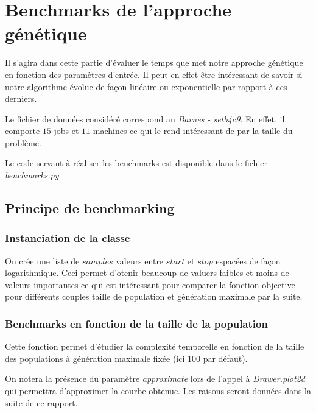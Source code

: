 \section{Benchmarks de l'approche génétique}

Il s'agira dans cette partie d'évaluer le temps que met notre approche génétique en fonction des paramètres d'entrée. Il peut en effet être intéressant de savoir si notre algorithme évolue de façon linéaire ou exponentielle par rapport à ces derniers.

Le fichier de données considéré correspond au \textit{Barnes - setb4c9}. En effet, il comporte $15$ jobs et $11$ machines ce qui le rend intéressant de par la taille du problème.

Le code servant à réaliser les benchmarks est disponible dans le fichier \textit{benchmarks.py}.

\subsection{Principe de benchmarking}

\subsubsection{Instanciation de la classe}



On crée une liste de $samples$ valeurs entre $start$ et $stop$ espacées de façon logarithmique. Ceci permet d'otenir beaucoup de valuers faibles et moins de valeurs importantes ce qui est intéressant pour comparer la fonction objective pour différents couples taille de population et génération maximale par la suite.

\subsubsection{Benchmarks en fonction de la taille de la population}



Cette fonction permet d'étudier la complexité temporelle en fonction de la taille des populations à génération maximale fixée (ici 100 par défaut).

On notera la présence du paramètre \textit{approximate} lors de l'appel à \textit{Drawer.plot2d} qui permettra d'approximer la courbe obtenue. Les raisons seront données dans la suite de ce rapport.


